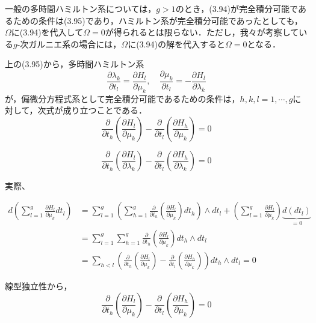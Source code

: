 \begin{story}
一般の多時間ハミルトン系については，$g>1$のとき，(3.94)が完全積分可能であるための条件は(3.95)であり，ハミルトン系が完全積分可能であったとしても，$\Omega$に(3.94)を代入して$\Omega=0$が得られるとは限らない．ただし，我々が考察している$g$-次ガルニエ系の場合には，$\Omega$に(3.94)の解を代入すると$\Omega=0$となる．

上の(3.95)から，多時間ハミルトン系
\begin{equation}
    \frac{\partial \lambda_k}{\partial t_l} = \frac{\partial H_l}{\partial \mu_k}, \quad \frac{\partial \mu_k}{\partial t_l} = - \frac{\partial H_l}{\partial \lambda_k} \tag{3.96}
\end{equation}
が，偏微分方程式系として完全積分可能であるための条件は，$h, k, l=1, \cdots, g$に対して，次式が成り立つことである．
\begin{equation}
    \frac{\partial}{\partial t_h} \left( \frac{\partial H_l}{\partial \mu_k} \right) - \frac{\partial}{\partial t_l} \left( \frac{\partial H_h}{\partial \mu_k} \right) = 0 \tag{3.97}
\end{equation}

\begin{equation}
    \frac{\partial}{\partial t_h} \left( \frac{\partial H_l}{\partial \lambda_k} \right) - \frac{\partial}{\partial t_l} \left( \frac{\partial H_h}{\partial \lambda_k} \right) = 0 \tag{3.98}
\end{equation}

\end{story}
実際、

\begin{align*}
    d \left( \sum_{l=1}^g \frac{\partial H_l}{\partial \mu_k} dt_l \right) &= \sum_{l=1}^g \left( \sum_{h=1}^g \frac{\partial}{\partial t_h} \left( \frac{\partial H_l}{\partial \mu_k} \right) dt_h \right) \wedge dt_l + \left( \sum_{l=1}^g \frac{\partial H_l}{\partial \mu_k} \right) \underbrace{d(dt_l)}_{=0} \\
    &= \sum_{l=1}^g \sum_{h=1}^g \frac{\partial}{\partial t_h} \left( \frac{\partial H_l}{\partial \mu_k} \right) dt_h \wedge dt_l \\
    &= \sum_{h < l} \left( \frac{\partial}{\partial t_h} \left( \frac{\partial H_l}{\partial \mu_k} \right) - \frac{\partial}{\partial t_l} \left( \frac{\partial H_h}{\partial \mu_k} \right) \right) dt_h \wedge dt_l = 0
\end{align*}

\vspace{1em}
\noindent
線型独立性から，
\begin{equation*}
    \frac{\partial}{\partial t_h} \left( \frac{\partial H_l}{\partial \mu_k} \right) - \frac{\partial}{\partial t_l} \left( \frac{\partial H_h}{\partial \mu_k} \right) = 0
\end{equation*}

